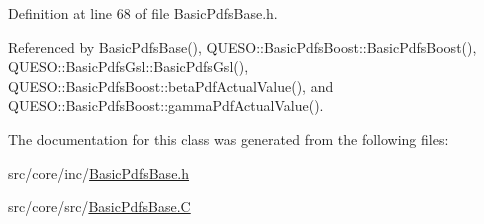 Definition at line 68 of file Basic\-Pdfs\-Base.\-h.



Referenced by Basic\-Pdfs\-Base(), Q\-U\-E\-S\-O\-::\-Basic\-Pdfs\-Boost\-::\-Basic\-Pdfs\-Boost(), Q\-U\-E\-S\-O\-::\-Basic\-Pdfs\-Gsl\-::\-Basic\-Pdfs\-Gsl(), Q\-U\-E\-S\-O\-::\-Basic\-Pdfs\-Boost\-::beta\-Pdf\-Actual\-Value(), and Q\-U\-E\-S\-O\-::\-Basic\-Pdfs\-Boost\-::gamma\-Pdf\-Actual\-Value().



The documentation for this class was generated from the following files\-:\begin{DoxyCompactItemize}
\item 
src/core/inc/\hyperlink{_basic_pdfs_base_8h}{Basic\-Pdfs\-Base.\-h}\item 
src/core/src/\hyperlink{_basic_pdfs_base_8_c}{Basic\-Pdfs\-Base.\-C}\end{DoxyCompactItemize}
